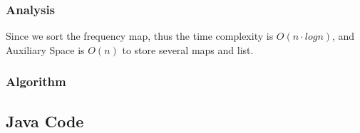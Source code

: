 \documentclass[]{book}
\begin{document}
\hypertarget{analysis-24}{%
\subsubsection{Analysis}\label{analysis-24}}

Since we sort the frequency map, thus the time complexity is \(O(n \cdot log n)\), and Auxiliary Space is \(O(n)\) to
store several maps and list.

\hypertarget{algorithm-24}{%
\subsubsection{Algorithm}\label{algorithm-24}}

\hypertarget{java-code-20}{%
\subsection{Java Code}\label{java-code-20}}
\end{document}
